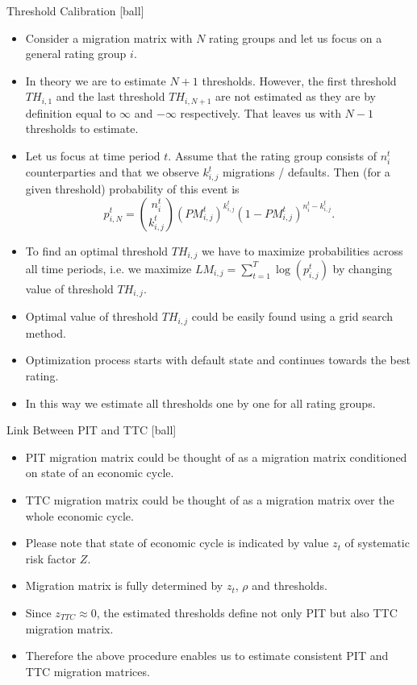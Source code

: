 \documentclass{beamer}
\begin{document}
\begin{frame}{Threshold Calibration}
[ball]
\begin{itemize}
	\item Consider a migration matrix with $N$ rating groups and let us focus on a general rating group $i$.
	\item In theory we are to estimate $N + 1$ thresholds. However, the first threshold $TH_{i,1}$ and the last threshold $TH_{i, N + 1}$ are not estimated as they are by definition equal to $\infty$ and $-\infty$ respectively. That leaves us with $N - 1$ thresholds to estimate.
	\item Let us focus at time period  $t$. Assume that the rating group consists of $n_i^t$ counterparties and that we observe $k_{i, j}^t$ migrations / defaults. Then (for a given threshold) probability of this event is
		\begin{equation}
			p_{i, N}^t = \binom{n_i^t}{k_{i, j}^t} \left(PM_{i,j}^t\right)^{k_{i, 
			j}^t} \left(1 - PM_{i,j}^t\right)^{n_i^t - k_{i, j}^t}.
		\end{equation}
	\item To find an optimal threshold $TH_{i, j}$ we have to maximize probabilities across all time periods, i.e. we maximize $LM_{i, j} = \sum_{t = 1}^T \log(p_{i, j}^t)$ by changing value of threshold $TH_{i,j}$.
	\item Optimal value of threshold $TH_{i, j}$ could be easily found using a grid search method.
	\item Optimization process starts with default state and continues towards the best rating.
	\item In this way we estimate all thresholds one by one for all rating groups.
\end{itemize}
\end{frame}

\begin{frame}{Link Between PIT and TTC}
[ball]
\begin{itemize}
	\item PIT migration matrix could be thought of as a migration matrix conditioned on state of an economic cycle.
	\item TTC migration matrix could be thought of as a migration matrix over the whole economic cycle.
	\item Please note that state of economic cycle is indicated by value $z_t$ of systematic risk factor $Z$.
	\item Migration matrix is fully determined by $z_t$, $\rho$ and thresholds.
	\item Since $z_{TTC} \approx 0$, the estimated thresholds define not only PIT but also TTC migration matrix.
	\item Therefore the above procedure enables us to estimate consistent PIT and TTC migration matrices.
\end{itemize}
\end{frame}
\end{document}

